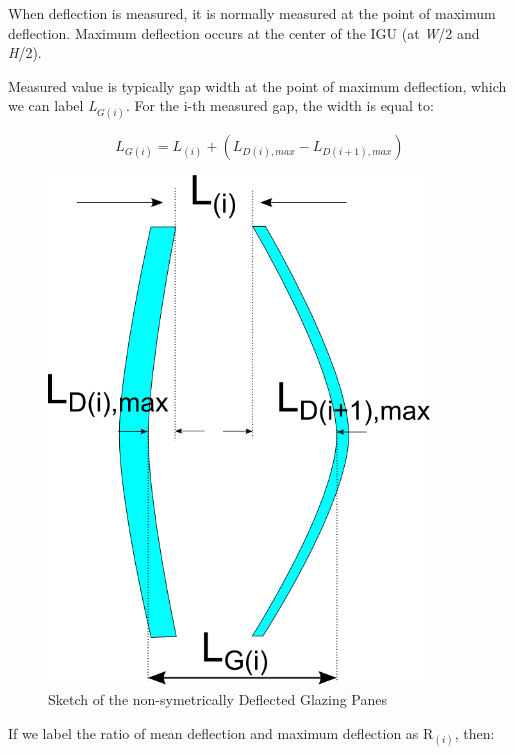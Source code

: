 When deflection is measured, it is normally measured at the point of maximum deflection. Maximum deflection occurs at the center of the IGU (at \emph{W}/2 and \emph{H}/2).

Measured value is typically gap width at the point of maximum deflection, which we can label \emph{L\(_{G(i)}\)}. For the i-th measured gap, the width is equal to:

\begin{equation}
{L_{G\left( i \right)}} = {L_{\left( i \right)}} + \left( {{L_{D\left( i \right),max}} - {L_{D\left( {i + 1} \right),max}}} \right)
\label{eq:IGULGiDeflection}
\end{equation}

\begin{figure}[hbtp] %
\centering
\includegraphics[width=0.9\textwidth, height=0.9\textheight, keepaspectratio=true]{media/image1798.png}
\caption{Sketch of the non-symetrically Deflected Glazing Panes \protect \label{fig:sketch-of-the-non-symetrically-deflected}}
\end{figure}

If we label the ratio of mean deflection and maximum deflection as R\(_{(i)}\), then:

